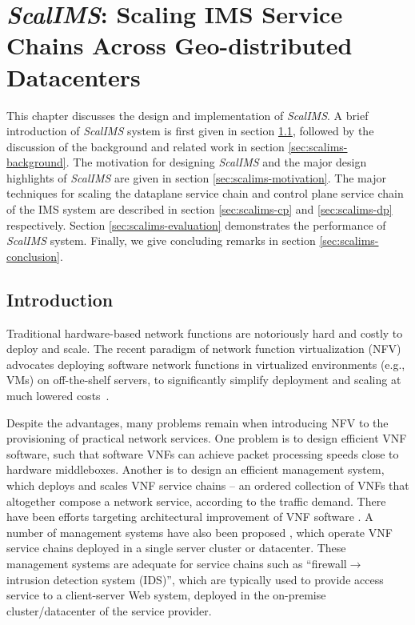 \chapter {\textit{ScalIMS}: Scaling IMS Service Chains Across Geo-distributed Datacenters}
\label{ch:scalims}

This chapter discusses the design and implementation of \textit{ScalIMS}. A brief introduction of \textit{ScalIMS} system is first given in section \ref{sec:scalims-introduction}, followed by the discussion of the background and related work in section \ref{sec:scalims-background}. The motivation for designing \textit{ScalIMS} and the major design highlights of \textit{ScalIMS} are given in section \ref{sec:scalims-motivation}. The major techniques for scaling the dataplane service chain and control plane service chain of the IMS system are described in section \ref{sec:scalims-cp} and \ref{sec:scalims-dp} respectively. Section \ref{sec:scalims-evaluation} demonstrates the performance of \textit{ScalIMS} system. Finally, we give concluding remarks in section \ref{sec:scalims-conclusion}.

\section{Introduction} \label{sec:scalims-introduction}

Traditional hardware-based network functions are notoriously hard and costly to deploy and scale. The recent paradigm of network function virtualization (NFV) advocates deploying software network functions in virtualized environments (e.g., VMs) on off-the-shelf servers, to significantly simplify deployment and scaling at much lowered costs~\cite{nfv-website}.

Despite the advantages, many problems remain when introducing NFV to the provisioning of practical network services. %
 One problem is to design efficient VNF software, such that software VNFs can achieve packet processing speeds close to hardware middleboxes. Another is to design an efficient management system, which deploys and scales VNF service chains -- an ordered collection of VNFs that altogether compose a network service, according to the traffic demand. There have been efforts targeting architectural improvement of VNF software \cite{martins2014clickos}. A number of management systems have also been proposed \cite{palkar2015e2, gember2012stratos}, which operate VNF service chains deployed in a single server cluster or datacenter. These management systems are adequate for service chains such as ``firewall$\rightarrow$ intrusion detection system (IDS)'', %
 which are typically used to provide access service to a client-server Web system, %
  deployed in the on-premise cluster/datacenter of the service provider.


